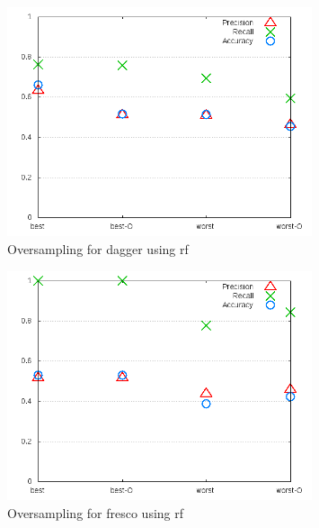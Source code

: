 \begin{figure}[!ht]
    \centering
        \includegraphics[width=0.8\textwidth]{images/rf/test_4/dagger_sample_range}
        \caption{Oversampling for dagger using \gls{rf}}
        \label{fig:test_4_dagger_rf}
\end{figure}



\begin{figure}[!ht]
    \centering
        \includegraphics[width=0.8\textwidth]{images/rf/test_4/fresco_sample_range}
        \caption{Oversampling for fresco using \gls{rf}}
        \label{fig:test_4_fresco_rf}
\end{figure}


